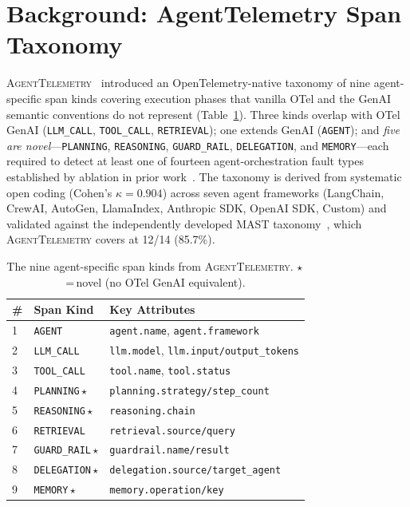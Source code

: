 \documentclass[11pt]{article}
\begin{document}
\section{Background: AgentTelemetry Span Taxonomy}
\label{sec:background}

\textsc{AgentTelemetry}~\citep{aiware2026} introduced an
OpenTelemetry-native taxonomy of nine agent-specific span kinds
covering execution phases that vanilla OTel and the GenAI semantic
conventions do not represent (Table~\ref{tab:spantaxonomy}). Three
kinds overlap with OTel GenAI (\texttt{LLM\_CALL}, \texttt{TOOL\_CALL},
\texttt{RETRIEVAL}); one extends GenAI (\texttt{AGENT}); and \emph{five
are novel}---\texttt{PLANNING}, \texttt{REASONING},
\texttt{GUARD\_RAIL}, \texttt{DELEGATION}, and \texttt{MEMORY}---each
required to detect at least one of fourteen agent-orchestration fault
types established by ablation in prior work~\citep{aiware2026}. The
taxonomy is derived from systematic open coding (Cohen's
$\kappa{=}0.904$) across seven agent frameworks (LangChain, CrewAI,
AutoGen, LlamaIndex, Anthropic SDK, OpenAI SDK, Custom) and validated
against the independently developed MAST taxonomy~\citep{mast}, which
\textsc{AgentTelemetry} covers at 12/14 (85.7\%).

\begin{table}[t]
\centering
\small
\caption{The nine agent-specific span kinds from \textsc{AgentTelemetry}.
$\star$\,=\,novel (no OTel GenAI equivalent).}
\label{tab:spantaxonomy}
\begin{tabular}{@{}llp{3.4cm}@{}}
\toprule
\textbf{\#} & \textbf{Span Kind} & \textbf{Key Attributes} \\
\midrule
1 & \texttt{AGENT}      & \texttt{agent.name}, \texttt{agent.framework} \\
2 & \texttt{LLM\_CALL}  & \texttt{llm.model}, \texttt{llm.input/output\_tokens} \\
3 & \texttt{TOOL\_CALL} & \texttt{tool.name}, \texttt{tool.status} \\
4 & \texttt{PLANNING}\,$\star$   & \texttt{planning.strategy/step\_count} \\
5 & \texttt{REASONING}\,$\star$  & \texttt{reasoning.chain} \\
6 & \texttt{RETRIEVAL}  & \texttt{retrieval.source/query} \\
7 & \texttt{GUARD\_RAIL}\,$\star$& \texttt{guardrail.name/result} \\
8 & \texttt{DELEGATION}\,$\star$ & \texttt{delegation.source/target\_agent} \\
9 & \texttt{MEMORY}\,$\star$     & \texttt{memory.operation/key} \\
\bottomrule
\end{tabular}
\end{table}
\end{document}
